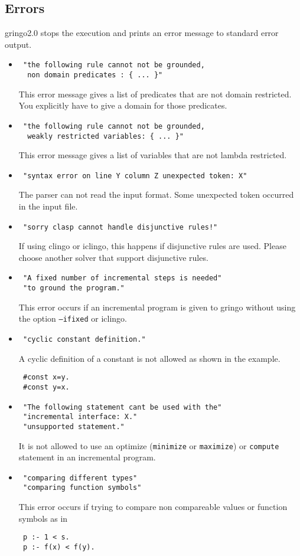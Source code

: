 \documentclass[a4paper,10pt]{article}
\begin{document}
\subsection{Errors}
gringo2.0 stops the execution and prints an error message to standard error output.
\begin{itemize}
 \item 
\begin{verbatim}
 "the following rule cannot not be grounded,
  non domain predicates : { ... }"
\end{verbatim}
This error message gives a list of predicates that are not domain restricted.
You explicitly have to give a domain for those predicates.
 \item 
\begin{verbatim}
 "the following rule cannot not be grounded,
  weakly restricted variables: { ... }"
\end{verbatim}
This error message gives a list of variables that are not lambda restricted. 
\item
\begin{verbatim}
 "syntax error on line Y column Z unexpected token: X"
\end{verbatim}
The parser can not read the input format. Some unexpected token occurred in the input file.
\item
\begin{verbatim}
 "sorry clasp cannot handle disjunctive rules!"
\end{verbatim}
If using clingo or iclingo, this happens if disjunctive rules are used. Please choose another solver that support disjunctive rules.
\item
\begin{verbatim}
 "A fixed number of incremental steps is needed"
 "to ground the program."
\end{verbatim}
This error occurs if an incremental program is given to gringo without using the option \texttt{--ifixed} or iclingo.
\item
\begin{verbatim}
 "cyclic constant definition."
\end{verbatim}
A cyclic definition of a constant is not allowed as shown in the example.
\begin{verbatim}
 #const x=y.
 #const y=x.
\end{verbatim}
\item
\begin{verbatim}
 "The following statement cant be used with the"
 "incremental interface: X."
 "unsupported statement."
\end{verbatim}
It is not allowed to use an optimize (\texttt{minimize} or \texttt{maximize}) or \texttt{compute} statement in an incremental program.
\item
\begin{verbatim}
 "comparing different types"
 "comparing function symbols"
\end{verbatim}
This error occurs if trying to compare non compareable values or function symbols as in
\begin{verbatim}
 p :- 1 < s.
 p :- f(x) < f(y).
\end{verbatim}


\end{itemize}
\end{document}

